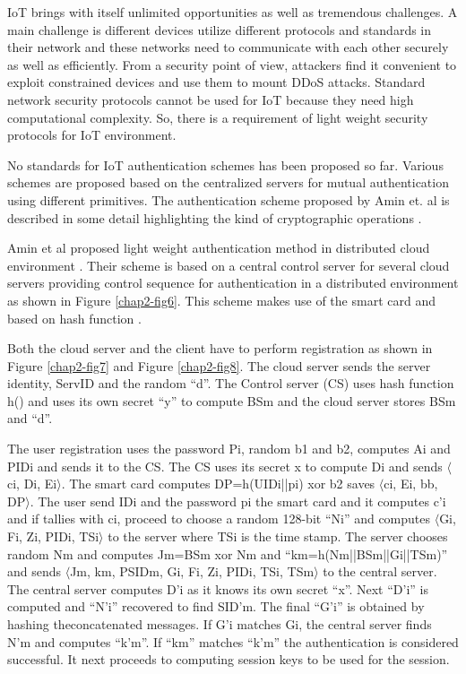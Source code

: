 \begin{multicols}{2}
IoT brings with itself unlimited opportunities as well as tremendous challenges. A main challenge is different devices utilize different protocols and standards in their network and these networks need to communicate with each other securely as well as efficiently. From a security point of view, attackers find it convenient to exploit constrained devices and use them to mount DDoS attacks. Standard network security protocols cannot be used for IoT because they need high computational complexity. So, there is a requirement of light weight security protocols for IoT environment.

No standards for IoT authentication schemes has been proposed so far. Various schemes are proposed based on the centralized servers for mutual authentication using different primitives. The authentication scheme proposed by Amin et. al is described in some detail highlighting the kind of cryptographic operations \cite{chap2-key22}.

Amin et al proposed light weight authentication method in distributed cloud environment \cite{chap2-key19}. Their scheme is based on a central control server for several cloud servers providing control sequence for authentication in a distributed environment as shown in Figure \ref{chap2-fig6}. This scheme makes use of the smart card and based on hash function \cite{chap2-key23}.

Both the cloud server and the client have to perform registration as shown in Figure \ref{chap2-fig7} and Figure \ref{chap2-fig8}. The cloud server sends the server identity, ServID and the random ``d''. The Control server (CS) uses hash function h() and uses its own secret ``y'' to compute BSm and the cloud server stores BSm and ``d''.

The user registration uses the password Pi, random b1 and b2, computes Ai and PIDi and sends it to the CS. The CS uses its secret x to compute Di and sends $\langle$ci, Di, Ei$\rangle$. The smart card computes DP=h(UIDi||pi) xor b2 saves $\langle$ci, Ei, bb, DP$\rangle$. The user send IDi and the password pi the smart card and it computes c'i and if tallies with ci, proceed to choose a random 128-bit ``Ni'' and computes  $\langle$Gi, Fi, Zi, PIDi, TSi$\rangle$ to the server where TSi is the time stamp. The server chooses random Nm and computes Jm=BSm xor Nm and ``km=h(Nm||BSm||Gi||TSm)'' and sends $\langle$Jm, km, PSIDm, Gi, Fi, Zi, PIDi, TSi, TSm$\rangle$ to the central server. The central server computes D'i as it knows its own secret ``x''. Next ``D'i'' is computed and ``N'i'' recovered to find SID'm. The final ``G'i'' is obtained by hashing the\break concatenated messages. If G'i matches Gi, the central server finds N'm and computes ``k'm''. If ``km'' matches ``k'm'' the authentication is considered successful. It next proceeds to computing session keys to be used for the session.


\end{multicols}
